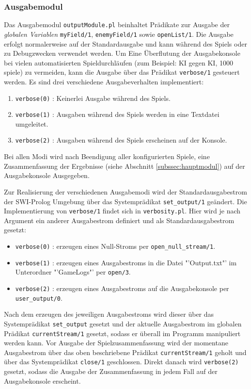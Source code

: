 \subsubsection{Ausgabemodul}
	Das Ausgabemodul \texttt{outputModule.pl} beinhaltet Prädikate zur Ausgabe der \textit{globalen Variablen} \texttt{myField/1},
	\texttt{enemyField/1} sowie \texttt{openList/1}. Die Ausgabe erfolgt normalerweise auf der Standardausgabe und kann während des Spiels oder zu
	Debugzwecken verwendet werden.
	Um Eine Überflutung der Ausgabekonsole bei vielen automatisierten Spieldurchläufen (zum Beispiel: KI gegen KI, 1000 spiele) zu vermeiden, kann 
	die Ausgabe über das Prädikat \texttt{verbose/1} gesteuert werden. Es sind drei verschiedene Ausgabeverhalten implementiert:
	\begin{enumerate}
		\item \texttt{verbose(0)} : Keinerlei Ausgabe während des Spiels.
		\item \texttt{verbose(1)} : Ausgaben während des Spiels werden in eine Textdatei umgeleitet.
		\item \texttt{verbose(2)} : Ausgaben während des Spiels erscheinen auf der Konsole.
	\end{enumerate}
	Bei allen Modi wird nach Beendigung aller konfigurierten Spiele, eine Zusammenfassung der Ergebnisse (siehe Abschnitt \ref{subssec:hauptmodul}) 
	auf der Ausgabekonsole Ausgegeben.
	
	Zur Realisierung der verschiedenen Ausgabemodi wird der Standardausgabestrom der SWI-Prolog Umgebung über das Systemprädikat \texttt{set\_output/1} 
	geändert. Die Implementierung von \texttt{verbose/1} findet sich in \texttt{verbosity.pl}. Hier wird je nach Argument ein anderer Ausgabestrom 
	definiert und als Standardausgabestrom gesetzt:
	\begin{itemize}
		\item \texttt{verbose(0)} : erzeugen eines Null-Stroms per \texttt{open\_null\_stream/1}.
		\item \texttt{verbose(1)} : erzeugen eines Ausgabestroms in die Datei "'Output.txt"' im Unterordner "'GameLogs"' per \texttt{open/3}.
		\item \texttt{verbose(2)} : erzeugen eines Ausgabestroms auf die Ausgabekonsole per \texttt{user\_output/0}.
	\end{itemize}
	Nach dem erzeugen des jeweiligen Ausgabestroms wird dieser über das Systemprädikat \texttt{set\_output} gesetzt und der aktuelle Ausgabestrom 
	im globalen Prädikat \texttt{currentStream/1} gesetzt, sodass er überall im Programm manipuliert werden kann.
	Vor Ausgabe der Spielzusammenfassung wird der momentane Ausgabestrom über das oben beschriebene Prädikat \texttt{currentStream/1} geholt und 
	über das Systemprädikat \texttt{close/1} geschlossen. Direkt danach wird \texttt{verbose(2)} gesetzt, sodass die Ausgabe der Zusammenfassung in jedem Fall 
	auf der Ausgabekonsole erscheint.
	

